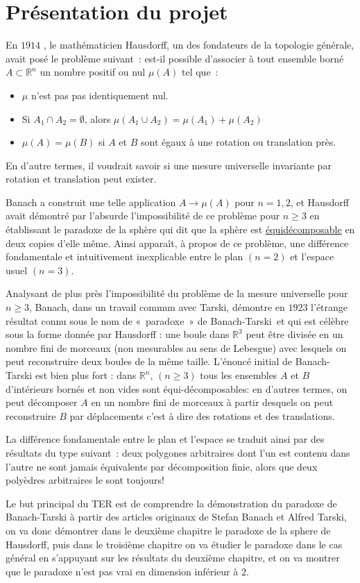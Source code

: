 \chapter{Présentation du projet}
En $1914$ \cite{cite3}, le mathématicien Hausdorff, un des fondateurs de la topologie générale, avait posé le problème suivant : est-il possible d'associer à tout ensemble borné $A \subset \mathbb{R}^n$  un nombre positif ou nul $\mu(A)$ tel que :
\begin{itemize}
  \item $\mu$ n'est pas pas identiquement nul.
  \item Si $A_1 \cap A_2 = \emptyset$, alors $\mu(A_1 \cup  A_2) = \mu(A_1) + \mu(A_2)$
  \item $\mu(A) = \mu(B)$ si $A$ et $B$ sont égaux à une rotation ou translation près.
\end{itemize}
En d'autre termes, il voudrait savoir si une mesure universelle invariante par rotation et translation peut exister.\par
Banach a construit une telle application $A \rightarrow \mu(A)$ pour $n = 1, 2$\cite{cite4}, et Hausdorff avait démontré par l'absurde l'impossibilité de ce problème pour $n \ge 3$ en établissant le paradoxe de la sphère qui dit que la sphère est \hyperref[ed]{équidécomposable} en deux copies d'elle même. Ainsi apparaît, à propos de ce problème, une différence fondamentale et intuitivement inexplicable entre le plan $(n=2)$ et l'espace usuel $(n=3)$.\par Analysant de plus près l'impossibilité du problème de la mesure universelle pour $n \ge 3$, Banach, dans un travail commun avec Tarski\cite{cite0}, démontre en $1923$ l'étrange résultat connu sous le nom de « paradoxe » de Banach-Tarski et qui est célèbre sous la forme donnée par Hausdorff : une boule dans $\mathbb{R}^3$
peut être divisée en un nombre fini de morceaux (non mesurables au sens de Lebesgue) avec lesquels on
peut reconstruire deux boules de la même taille. L’énoncé initial de Banach-Tarski est bien
plus fort : dans $\mathbb{R}^n$, $(n\ge 3)$ tous les ensembles $A$ et $B$ d’intérieurs bornés et non vides sont
équi-décomposables: en d’autres termes, on peut décomposer $A$ en un nombre fini de
morceaux à partir desquels on peut reconstruire $B$ par déplacements c'est à dire des rotations et des translations.\par
La différence fondamentale entre le plan et l'espace se traduit ainsi par des résultats du type suivant : deux polygones arbitraires dont l'un est contenu dans l'autre ne sont jamais équivalents par décomposition finie, alors que deux polyèdres arbitraires le sont toujours!\par
Le but principal du TER est de comprendre la démonstration du paradoxe de Banach-Tarski à partir des articles originaux de Stefan Banach et Alfred Tarski, on va donc démontrer dans le deuxième chapitre le paradoxe de la sphere de Hausdorff, puis dans le troisième chapitre on va étudier le paradoxe dans le cas général en s'appuyant sur les résultats du deuxième chapitre, et on va montrer que le paradoxe n'est pas vrai en dimension inférieur à $2$.
